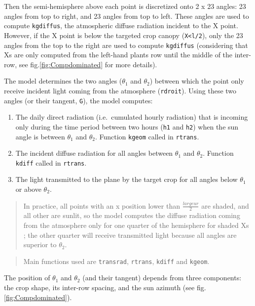 \documentclass[]{book}
\providecommand{\tightlist}{%
  \setlength{\itemsep}{0pt}\setlength{\parskip}{0pt}}
\theoremstyle{definition}
\theoremstyle{definition}
\theoremstyle{definition}
\theoremstyle{remark}
\begin{document}
Then the semi-hemisphere above each point is discretized onto 2 x 23
angles: 23 angles from top to right, and 23 angles from top to left.
These angles are used to compute \texttt{kgdiffus}, the atmospheric
diffuse radiation incident to the X point. However, if the X point is
below the targeted crop canopy (\texttt{X\textless{}l/2}), only the 23
angles from the top to the right are used to compute \texttt{kgdiffus}
(considering that Xs are only computed from the left-hand plants row
until the middle of the inter-row, see fig.\ref{fig:Compdominated} for
more details).

The model determines the two angles (\(\theta_1\) and \(\theta_2\))
between which the point only receive incident light coming from the
atmosphere (\texttt{rdroit}). Using these two angles (or their tangent,
\texttt{G}), the model computes:

\begin{enumerate}
\def\labelenumi{\arabic{enumi}.}
\tightlist
\item
  The daily direct radiation (i.e.~cumulated hourly radiation) that is
  incoming only during the time period between two hours (\texttt{h1}
  and \texttt{h2}) when the sun angle is between \(\theta_1\) and
  \(\theta_2\). Function \texttt{kgeom} called in \texttt{rtrans}.
\item
  The incident diffuse radiation for all angles between \(\theta_1\) and
  \(\theta_2\). Function \texttt{kdiff} called in \texttt{rtrans}.
\item
  The light transmitted to the plane by the target crop for all angles
  below \(\theta_1\) or above \(\theta_2\).
\end{enumerate}

\begin{quote}
In practice, all points with an x position lower than
\(\frac{largeur}{2}\) are shaded, and all other are sunlit, so the model
computes the diffuse radiation coming from the atmosphere only for one
quarter of the hemisphere for shaded Xs ; the other quarter will receive
transmitted light because all angles are superior to \(\theta_2\).
\end{quote}

\begin{quote}
Main functions used are \texttt{transrad}, \texttt{rtrans},
\texttt{kdiff} and \texttt{kgeom}.
\end{quote}

The position of \(\theta_1\) and \(\theta_2\) (and their tangent)
depends from three components: the crop shape, its inter-row spacing,
and the sun azimuth (see fig. \ref{fig:Compdominated}).
\end{document}
